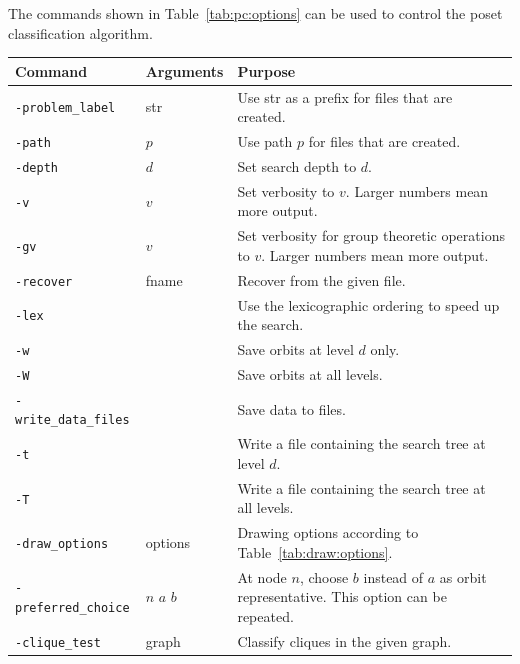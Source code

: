 The commands shown in Table~\ref{tab:pc:options}
can be used to control the poset classification algorithm.
\begin{table}
\begin{center}
\begin{tabular}{|p{4cm}|p{3cm}|p{8cm}|}
\hline
Command & Arguments & Purpose \\
\hline
\hline
\verb'-problem_label' & str   & Use str as a prefix for files that are created. \\
\hline
\verb'-path' & $p$   & Use path $p$ for files that are created. \\
\hline
\verb'-depth' & $d$  & Set search depth to $d$. \\
\hline
\verb'-v' & $v$  & Set verbosity to $v$. Larger numbers mean more output. \\
\hline
\verb'-gv' & $v$  & Set verbosity for group theoretic operations to $v$. Larger numbers mean more output. \\
\hline
\verb'-recover' & fname  & Recover from the given file. \\
\hline
\verb'-lex' &   & Use the lexicographic ordering to speed up the search. \\
\hline
\verb'-w' &   & Save orbits at level $d$ only. \\
\hline
\verb'-W' &   & Save orbits at all levels. \\
\hline
\verb'-write_data_files' &   & Save data to files. \\
\hline
\verb'-t' &   & Write a file containing the search tree at level $d$.  \\
\hline
\verb'-T' &   & Write a file containing the search tree at all levels. \\
\hline
\verb'-draw_options' & options & Drawing options according to Table~\ref{tab:draw:options}. \\
\hline
\verb'-preferred_choice' & $n$ $a$ $b$ & 
At node $n$, choose $b$ instead of $a$ as orbit representative. This option can be repeated. \\
\hline
\verb'-clique_test' & graph  & 
Classify cliques in the given graph. \\
\hline

\end{tabular}
\end{center}
\end{table}
